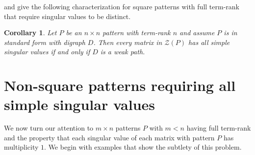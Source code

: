 \documentclass[preprint,12pt]{elsarticle}
\newtheorem{corollary}[theorem]{Corollary}
\begin{document}
and  give the
following characterization for square 
patterns with full term-rank that require  singular values to be  distinct.

\begin{corollary}
\label{fiedlersquare}
Let $P$ be an $n\times n$ pattern with term-rank $n$ and assume $P$ is in standard form with digraph $D$.  Then every matrix in $\mathcal{Z}(P)$ has all simple singular values
if and only if $D$ is a weak path. 
\end{corollary}


\section{Non-square patterns requiring all simple singular values}

We now turn our attention to $m\times n$ patterns $P$ with $m<n$ having full term-rank
and the property that each singular value of each matrix with pattern $P$ has multiplicity $1$. We begin with  examples that show the subtlety of this problem.
\end{document}
